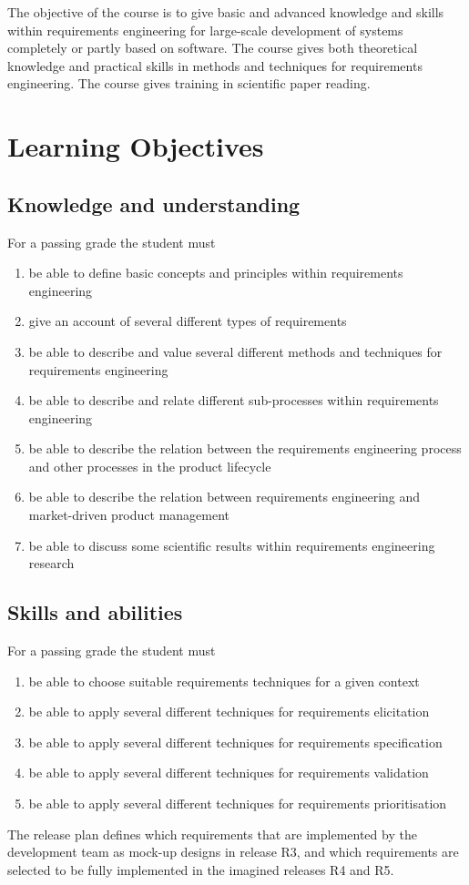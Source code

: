 \documentclass[10pt,a4paper]{article}
\title{\bf\sffamily\fontsize{18}{18}\selectfont{
Course Program\\ ETS170 Requirements Engineering\\http://cs.lth.se/ets170 
}}
\author{\bf\sffamily\fontsize{12}{12}\selectfont{Björn Regnell, Elizabeth Bjarnason}}
\date{\bf\sffamily\fontsize{10}{10}\selectfont{Study period: 2016-HT2, Revision date: \today}}
\begin{document}
\maketitle
\noindent 
The objective of the course is to give basic and advanced knowledge and skills within requirements engineering for large-scale development of systems completely or partly based on software. The course gives both theoretical knowledge and practical skills in methods and techniques for requirements engineering. The course gives training in scientific paper reading.

\section{Learning Objectives}
\subsection{Knowledge and understanding}
For a passing grade the student must
\begin{enumerate}[noitemsep]
\item be able to define basic concepts and principles within requirements engineering 
\item give an account of several different types of requirements
\item be able to describe and value several different methods and techniques for requirements engineering
\item be able to describe and relate different sub-processes within requirements engineering
\item be able to describe the relation between the requirements engineering process and other processes in the product lifecycle
\item be able to describe the relation between requirements engineering and market-driven product management
\item be able to discuss some scientific results within requirements engineering research
\end{enumerate}


\subsection{Skills and abilities}
For a passing grade the student must
\begin{enumerate}[noitemsep]
\item be able to choose suitable requirements techniques for a given context
\item     be able to apply several different techniques for requirements elicitation
\item     be able to apply several different techniques for requirements specification
\item     be able to apply several different techniques for requirements validation
\item     be able to apply several different techniques for requirements prioritisation
\end{enumerate}
  The release plan defines which requirements that are implemented by the development team as mock-up designs in release R3, and which requirements are selected to be fully implemented in the imagined releases R4 and R5. 
\end{document}
